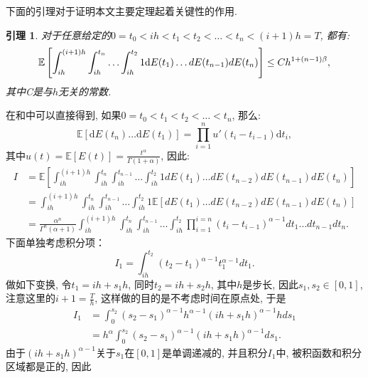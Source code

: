 \documentclass[12pt, final]{article}
\makeatletter
\numberwithin{equation}{section}
\numberwithin{figure}{section}
\numberwithin{table}{section}
\theoremstyle{plain}
\renewcommand{\proofname}{证明}
\newtheorem{Lemma}[Theorem]{引理}      %
\theoremstyle{Definition}
\theoremstyle{Remark}
\renewenvironment{proof}[1][\proofname]{\par
	\pushQED{\qed}%
	\normalfont \topsep6\p@\@plus6\p@\relax
	\trivlist\item[\hskip\labelsep
	\bfseries #1\@addpunct{\, :\, }]\ignorespaces
}{%
	\popQED\endtrivlist\@endpefalse
}
\makeatother
\begin{document}
	下面的引理对于证明本文主要定理起着关键性的作用. 
	\begin{Lemma}\label{main lamma}
		对于任意给定的$0 = t_0 < ih < t_1 < t_2 < \ldots <t_n <(i+1)h=T$, 都有:
		\begin{equation}
			\mathbb{E}\left[\int_{ih}^{(i+1)h}
			\int_{ih}^{t_n} \ldots \int_{ih}^{t_2} 1 \textnormal{d}E({t_1}) \ldots dE({t_{n-1}})dE({t_n})\right] \le Ch^{1+(n-1)\beta}, 
		\end{equation}
		其中C是与$h$无关的常数. 
	\end{Lemma}
	
	
	\begin{proof}    
		在\cite{daley2003introduction}和\cite{magdziarz2009stochastic}中可以直接得到, 如果$0 = t_0 < t_1 < t_2 < \ldots <t_n$, 那么:
		\begin{equation*}
			\mathbb{E}[\mathrm dE(t_n)\ldots\mathrm dE(t_1)]=\prod_{i=1}^nu'(t_i-t_{i-1})\mathrm dt_i, 
		\end{equation*}
		其中$u(t)=\mathbb{E}[E(t)]=\frac{t^\alpha}{\Gamma(1+\alpha)}$, 因此:
		\begin{align*}
			I &= \mathbb{E}\left[\int_{ih}^{(i+1)h}
			\int_{ih}^{t_n}\int_{ih}^{t_{n-1}} \ldots \int_{ih}^{t_{2}} 1 dE(t_1) \ldots dE(t_{n-2})dE(t_{n-1})dE(t_n)\right] \\
			& = \int_{ih}^{(i+1)h}\int_{ih}^{t_n}\int_{ih}^{t_{n-1}}
			\ldots \int_{ih}^{t_{2}} 1 \mathbb{E}\left[dE(t_1) \ldots dE(t_{n-2})dE(t_{n-1})dE(t_n)\right] \\
			& = \frac{\alpha^n}{\Gamma^n(\alpha+1)}
			\int_{ih}^{(i+1)h}\int_{ih}^{t_n}\int_{ih}^{t_{n-1}} \ldots \int_{ih}^{t_{2}} \prod_{i=1}^{i=n}(t_i-t_{i-1})^{\alpha -1} dt_1 \ldots dt_{n-1}dt_n. 
		\end{align*}
		下面单独考虑积分项：
		\begin{equation*}
			I_{1}=\int_{ih}^{t_{2}} (t_{2}-t_1)^{\alpha -1} t_1^{\alpha - 1} dt_1. 
		\end{equation*}
		做如下变换, 令$t_{1} = ih + s_{1}h$, 同时$t_2 = ih + s_2h$, 其中$h$是步长, 因此$s_1, s_{2} \in [0, 1]$, 注意这里的$i+1=\frac{T}{h}$, 这样做的目的是不考虑时间在原点处, 于是
		\begin{align*}
			I_1 &= \int_{0}^{s_{2}} (s_{2}-s_{1})^{\alpha -1}h^{\alpha -1} (ih + s_1h)^{\alpha - 1}h ds_1 \\
			&= h^{\alpha}\int_{0}^{s_{2}} (s_{2}-s_{1})^{\alpha -1} (ih + s_1h)^{\alpha - 1} ds_1. 
		\end{align*}
		由于$(ih + s_1h)^{\alpha - 1}$关于$s_1$在$[0, 1]$是单调递减的, 并且积分$I_1$中, 被积函数和积分区域都是正的, 因此

\end{proof}
\end{document}
